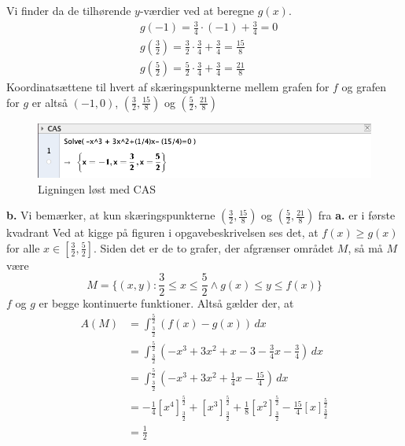 \documentclass{article}
\begin{document}
Vi finder da de tilhørende $y$-værdier ved at beregne $g(x)$.
\begin{equation*}
\begin{split}
  &g(-1)=\frac{3}{4} \cdot (-1)+\frac{3}{4}=0\\ 
  &g \left(\frac{3}{2}\right)=\frac{3}{2} \cdot \frac{3}{4}+\frac{3}{4}=\frac{15}{8}\\ 
  &g \left(\frac{5}{2}\right) =\frac{5}{2} \cdot \frac{3}{4} + \frac{3}{4}=\frac{21}{8}
\end{split}
\end{equation*}
Koordinatsættene til hvert af skæringspunkterne mellem grafen for $f$ og grafen for $g$ er altså $(-1,0)$, $\left(\frac{3}{2},\frac{15}{8}\right)$ og $\left(\frac{5}{2},\frac{21}{8}\right) $ 
\begin{figure}[H]
\begin{center}
  \includegraphics[scale=0.5]{tredjegrad.png}
\end{center}
\caption{Ligningen løst med CAS}
\label{fig:tredjegrad}
\end{figure}
\noindent\textbf{b.}
Vi bemærker, at kun skæringspunkterne $\left(\frac{3}{2},\frac{15}{8}\right)$ og $\left(\frac{5}{2},\frac{21}{8}\right) $ fra \textbf{a.} er i første kvadrant 
Ved at kigge på figuren i opgavebeskrivelsen ses det, at $f(x)\geq g(x)$ for alle $x \in \left[\frac{3}{2},\frac{5}{2}\right]$. 
Siden det er de to grafer, der afgrænser området $M$, så må $M$ være
\[
M=\{(x,y): \frac{3}{2}\leq x \leq \frac{5}{2} \land g(x) \leq y \leq f(x)\}
\] 
$f$ og $g$ er begge kontinuerte funktioner. 
Altså gælder der, at
\begin{equation*}
\begin{split}
  A(M)&=\int_{\frac{3}{2}}^{\frac{5}{2}} \left(f(x)-g(x)\right)  \,dx \\ 
  &=\int_{\frac{3}{2}}^{\frac{5}{2}} \left(-x^3+3x^2+x-3-\frac{3}{4}x-\frac{3}{4}\right)  \,dx \\ 
  &=\int_{\frac{3}{2}}^{\frac{5}{2}} \left(-x^3+3x^2+\frac{1}{4}x-\frac{15}{4}\right)  \,dx \\ 
  &=-\frac{1}{4}\left[x^4\right]_{\frac{3}{2}}^{\frac{5}{2}}+\left[x^3\right]_{\frac{3}{2}}^{\frac{5}{2}}+\frac{1}{8}\left[x^2\right]_{\frac{3}{2}}^{\frac{5}{2}}-\frac{15}{4}\left[x\right]_{\frac{3}{2}}^{\frac{5}{2}}\\ 
  &=\frac{1}{2}
\end{split}
\end{equation*}
\end{document}
